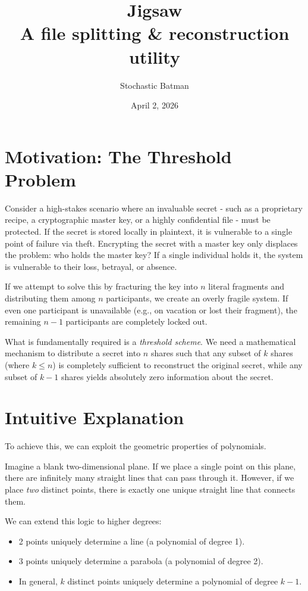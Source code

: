 \documentclass[12pt]{article}
\title{Jigsaw \\ \small{A file splitting \& reconstruction utility}}
\author{Stochastic Batman}
\date{April 2, 2026}
\theoremstyle{definition}
\theoremstyle{plain}
\begin{document}
	
	\maketitle
	
	\section{Motivation: The Threshold Problem}
	Consider a high-stakes scenario where an invaluable secret - such as a proprietary recipe, a cryptographic master key, or a highly confidential file - must be protected. If the secret is stored locally in plaintext, it is vulnerable to a single point of failure via theft. Encrypting the secret with a master key only displaces the problem: who holds the master key? If a single individual holds it, the system is vulnerable to their loss, betrayal, or absence. 
	
	If we attempt to solve this by fracturing the key into $n$ literal fragments and distributing them among $n$ participants, we create an overly fragile system. If even one participant is unavailable (e.g., on vacation or lost their fragment), the remaining $n-1$ participants are completely locked out. 
	
	What is fundamentally required is a \textit{threshold scheme}. We need a mathematical mechanism to distribute a secret into $n$ shares such that any subset of $k$ shares (where $k \le n$) is completely sufficient to reconstruct the original secret, while any subset of $k-1$ shares yields absolutely zero information about the secret.
	
	\section{Intuitive Explanation}
	To achieve this, we can exploit the geometric properties of polynomials. 
	
	Imagine a blank two-dimensional plane. If we place a single point on this plane, there are infinitely many straight lines that can pass through it. However, if we place \textit{two} distinct points, there is exactly one unique straight line that connects them. 
	
	We can extend this logic to higher degrees:
	\begin{itemize}
		\item 2 points uniquely determine a line (a polynomial of degree 1).
		\item 3 points uniquely determine a parabola (a polynomial of degree 2).
		\item In general, $k$ distinct points uniquely determine a polynomial of degree $k-1$.
	\end{itemize}
	
\end{document}
